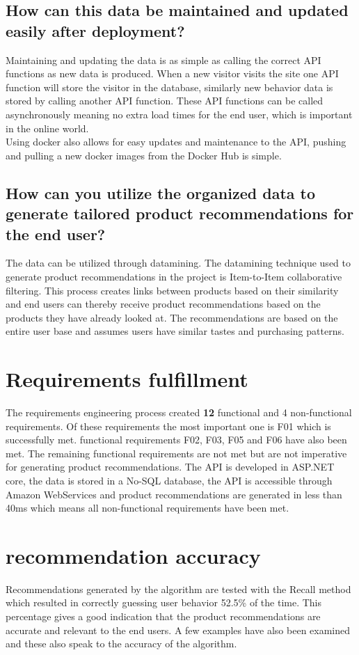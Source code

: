 \subsection{How can this data be maintained and updated easily after deployment?}
Maintaining and updating the data is as simple as calling the correct API functions as new data is produced. When a new visitor visits the site one API function will store the visitor in the database, similarly new behavior data is stored by calling another API function. These API functions can be called asynchronously meaning no extra load times for the end user, which is important in the online world. \\
Using docker also allows for easy updates and maintenance to the API, pushing and pulling a new docker images from the Docker Hub is simple.

\subsection{How can you utilize the organized data to generate tailored product recommendations for the end user?}
The data can be utilized through datamining. The datamining technique used to generate product recommendations in the project is Item-to-Item collaborative filtering. This process creates links between products based on their similarity and end users can thereby receive product recommendations based on the products they have already looked at. The recommendations are based on the entire user base and assumes users have similar tastes and purchasing patterns.

\section{Requirements fulfillment}
The requirements engineering process created \textbf{12} functional and 4 non-functional requirements. Of these requirements the most important one is F01 which is successfully met. functional requirements F02, F03, F05 and F06 have also been met. The remaining functional requirements are not met but are not imperative for generating product recommendations. The API is developed in ASP.NET core, the data is stored in a No-SQL database, the API is accessible through Amazon WebServices and product recommendations are generated in less than 40ms which means all non-functional requirements have been met.

\section{recommendation accuracy}
Recommendations generated by the algorithm are tested with the Recall method which resulted in correctly guessing user behavior 52.5\% of the time. This percentage gives a good indication that the product recommendations are accurate and relevant to the end users. A few examples have also been examined and these also speak to the accuracy of the algorithm. 